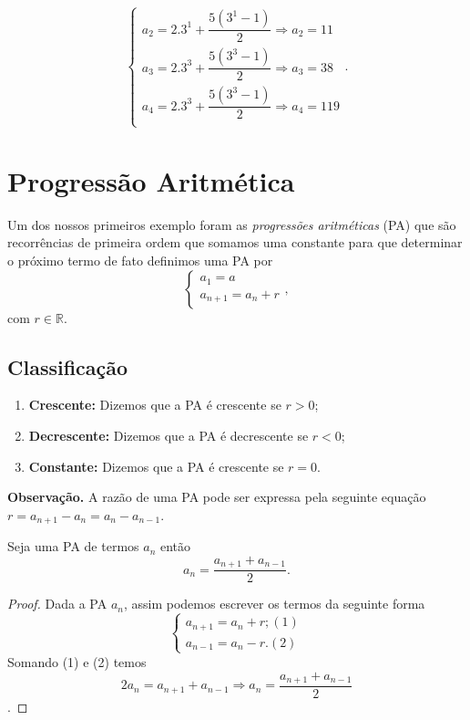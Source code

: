 \begin{equation}
    \begin{cases}
      a_2 = 2.3^1 + \dfrac{5(3^1-1)}{2} \Rightarrow a_2 = 11\\
      a_3 = 2.3^3 + \dfrac{5(3^3-1)}{2} \Rightarrow a_3 = 38\\
      a_4 = 2.3^3 + \dfrac{5(3^3-1)}{2} \Rightarrow a_4 = 119\\
    \end{cases}.
\end{equation}


\section{Progressão Aritmética}
\quad Um dos nossos primeiros exemplo foram as \textit{progressões aritméticas} (PA) que são recorrências de primeira ordem que somamos uma constante para que determinar o próximo termo de fato definimos uma PA por
	\begin{equation}
		\begin{cases}
		\label{recorr1}
		a_1 = a\\
		a_{n+1} = a_n + r
		\end{cases},
	\end{equation}
com $r \in \mathbb{R}$.

\subsection{Classificação}
    \begin{enumerate}
        \item[(i)] \textbf{Crescente:} Dizemos que a PA é crescente se $r>0$;
        \item[(ii)] \textbf{Decrescente:} Dizemos que a PA é decrescente se $r<0$;
        \item[(iii)] \textbf{Constante:} Dizemos que a PA é crescente se $r=0$.
    \end{enumerate}
\noindent \textbf{Observação.} A razão de uma PA pode ser expressa pela seguinte equação $r = a_{n+1} - a_n = a_n - a_{n-1}$.
\begin{prop}
 Seja uma PA de termos $a_n$ então
 \begin{equation}
     a_n = \frac{a_{n+1}+ a_{n-1}}{2}.
 \end{equation}
\end{prop}
\begin{proof}
Dada a PA $a_n$, assim podemos escrever os termos da seguinte forma
\begin{equation}
    \begin{cases}
    a_{n+1} = a_n + r; (1)\\ 
    a_{n-1} = a_n - r. (2)
    \end{cases}
\end{equation}
Somando (1) e (2) temos
$$2a_n = a_{n+1} + a_{n-1} \Rightarrow a_n = \frac{a_{n+1}+ a_{n-1}}{2}$$.
\end{proof}


